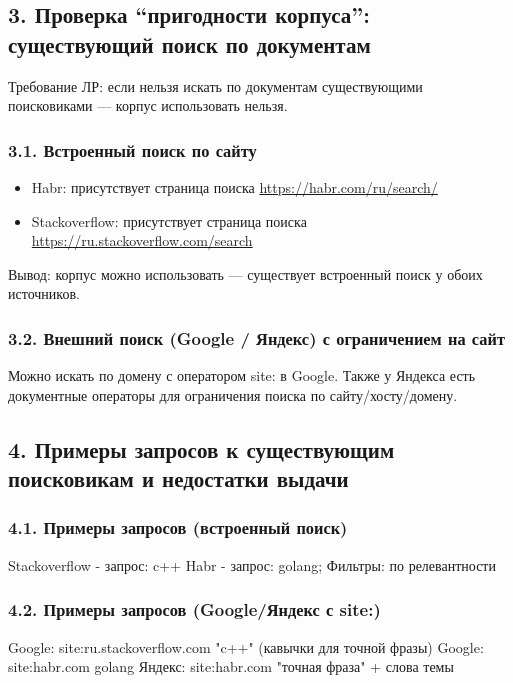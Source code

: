 \documentclass[12pt,a4paper]{article}
\begin{document}
\subsection*{3. Проверка “пригодности корпуса”: существующий поиск по документам}

Требование ЛР: если нельзя искать по документам существующими поисковиками — корпус использовать нельзя.

\subsubsection*{3.1. Встроенный поиск по сайту}

\begin{itemize}
\item Habr: присутствует страница поиска \url{https://habr.com/ru/search/} 
\item Stackoverflow: присутствует страница поиска \url{https://ru.stackoverflow.com/search}
\end{itemize}
Вывод: корпус можно использовать — существует встроенный поиск у обоих источников.

\subsubsection*{3.2. Внешний поиск (Google / Яндекс) с ограничением на сайт}

Можно искать по домену с оператором site: в Google. Также у Яндекса есть документные операторы для ограничения поиска по сайту/хосту/домену. 


\subsection*{4. Примеры запросов к существующим поисковикам и недостатки выдачи}

\subsubsection*{4.1. Примеры запросов (встроенный поиск)}

Stackoverflow - запрос: c++
\newline
Habr - запрос: golang; Фильтры: по релевантности 

\subsubsection*{4.2. Примеры запросов (Google/Яндекс с site:)}

Google: site:ru.stackoverflow.com "c++" (кавычки для точной фразы)
\newline
Google: site:habr.com golang
\newline
Яндекс: site:habr.com "точная фраза" + слова темы 
\end{document}
